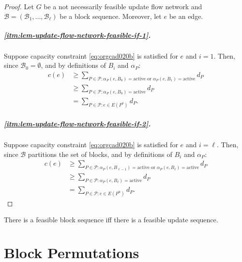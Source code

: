 \documentclass[fontsize=11pt,paper=a4]{book}
\begin{document}
\begin{proof}
Let \(G\) be a not necessarily feasible update flow network and \(\mathcal{B}=(\mathscr{B}_1,\dots,\mathscr{B}_{\ell})\) be a block sequence.
Moreover, let \(e\) be an edge.

\paragraph{\ref{itm:lem-update-flow-network-feasible-if-1}.}
Suppose capacity constraint \ref{eq:orgcad020b}  is satisfied for \(e\) and \(i=1\).
Then, since \(\mathscr{B}_0=\emptyset\), and by definitions of \(B_i\) and \(\alpha_P\):
\begin{align*}
c(e)
&\geq\sum_{P\in\mathcal{P}:\alpha_P(e,B_0)=\mathrm{active}\text{ or }\alpha_P(e,B_1)=\mathrm{active}}d_P\\
&\geq\sum_{P\in\mathcal{P}:\alpha_P(e,B_0)=\mathrm{active}}d_P\\
&=\sum_{P\in\mathcal{P}:e\in E(P^o)}d_P.
\end{align*}
\paragraph{\ref{itm:lem-update-flow-network-feasible-if-2}.}
Suppose capacity constraint \ref{eq:orgcad020b}  is satisfied for \(e\) and \(i=\ell\).
Then, since \(\mathcal{B}\) partitions the set of blocks, and by definitions of \(B_i\) and \(\alpha_P\):
\begin{align*}
c(e)
&\geq\sum_{P\in\mathcal{P}:\alpha_P(e,B_{\ell-1})=\mathrm{active}\text{ or }\alpha_P(e,B_{\ell})=\mathrm{active}}d_P\\
&\geq\sum_{P\in\mathcal{P}:\alpha_P(e,B_{\ell})=\mathrm{active}}d_P\\
&=\sum_{P\in\mathcal{P}:e\in E(P^u)}d_P.
\end{align*}
\end{proof}

\begin{corollary}
There is a feasible block sequence iff there is a feasible update sequence.
\label{orgc26c90e}
\end{corollary}

\chapter{Block Permutations}
\label{sec:orgdee2747}
\end{document}
